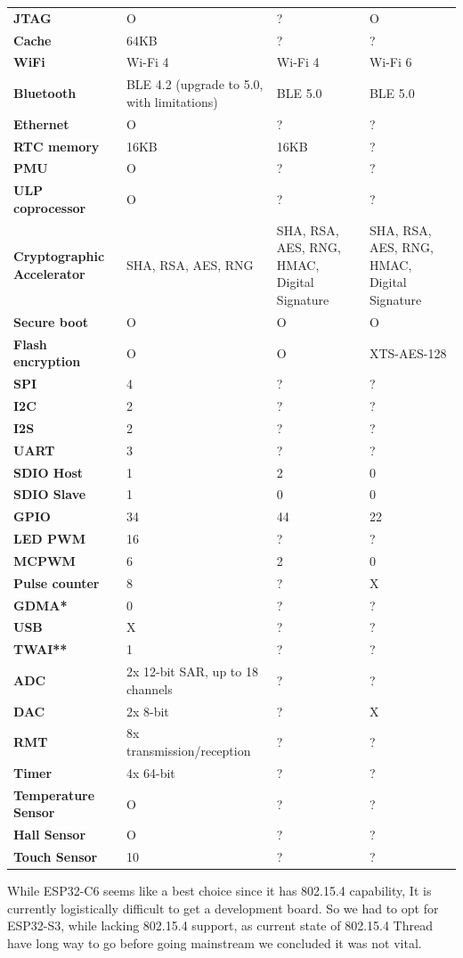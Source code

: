 \documentclass[conference]{IEEEtran}
\begin{document}
\begin{itemize}
\begin{table}[H]
\begin{tabular}{|m{1.8cm}|m{1.8cm}|m{1.8cm}|m{1.8cm}|}
\textbf{JTAG} & O & ? & O \\
\textbf{Cache} & 64KB & ? & ? \\
\textbf{WiFi} & Wi-Fi 4 & Wi-Fi 4 & Wi-Fi 6 \\
\textbf{Bluetooth} & BLE 4.2 (upgrade to 5.0, with limitations) & BLE 5.0 & BLE 5.0 \\
\textbf{Ethernet} & O & ? & ? \\
\textbf{RTC memory} & 16KB & 16KB & ? \\
\textbf{PMU} & O & ? & ? \\
\textbf{ULP coprocessor} & O & ? & ? \\
\textbf{Cryptographic Accelerator} & SHA, RSA, AES, RNG & SHA, RSA, AES, RNG, HMAC, Digital Signature & SHA, RSA, AES, RNG, HMAC, Digital Signature \\
\textbf{Secure boot} & O & O & O \\
\textbf{Flash encryption} & O & O & XTS-AES-128 \\
\textbf{SPI} & 4 & ? & ? \\
\textbf{I2C} & 2 & ? & ? \\
\textbf{I2S} & 2 & ? & ? \\
\textbf{UART} & 3 & ? & ? \\
\textbf{SDIO Host} & 1 & 2 & 0 \\
\textbf{SDIO Slave} & 1 & 0 & 0 \\
\textbf{GPIO} & 34 & 44 & 22 \\
\textbf{LED PWM} & 16 & ? & ? \\
\textbf{MCPWM} & 6 & 2 & 0 \\
\textbf{Pulse counter} & 8 & ? & X \\
\textbf{GDMA*} & 0 & ? & ? \\
\textbf{USB} & X & ? & ? \\
\textbf{TWAI**} & 1 & ? & ? \\
\textbf{ADC} & 2x 12-bit SAR, up to 18 channels & ? & ? \\
\textbf{DAC} & 2x 8-bit & ? & X \\
\textbf{RMT} & 8x transmission/reception & ? & ? \\
\textbf{Timer} & 4x 64-bit & ? & ? \\
\textbf{Temperature Sensor} & O & ? & ? \\
\textbf{Hall Sensor} & O & ? & ? \\
\textbf{Touch Sensor} & 10 & ? & ? \\
\hline
\end{tabular}
\end{table}


While ESP32-C6 seems like a best choice since it has 802.15.4 capability, It is currently logistically difficult to get a development board. So we had to opt for ESP32-S3, while lacking 802.15.4 support, as current state of 802.15.4 Thread have long way to go before going mainstream we concluded it was not vital.\\
\end{itemize}
\end{document}
